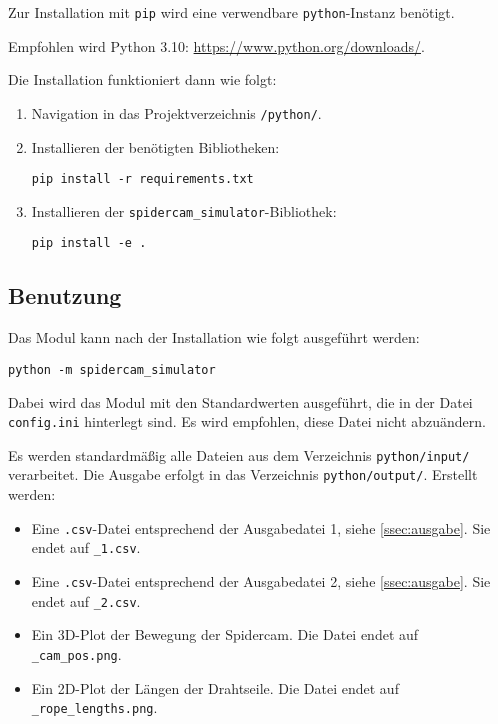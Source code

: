 Zur Installation mit \texttt{pip} wird eine verwendbare \texttt{python}-Instanz benötigt.

Empfohlen wird Python 3.10: \url{https://www.python.org/downloads/}.

Die Installation funktioniert dann wie folgt:
\begin{enumerate}
    \item Navigation in das Projektverzeichnis \texttt{/python/}.
    \item Installieren der benötigten Bibliotheken:
          \begin{center}
              \texttt{pip install -r requirements.txt}
          \end{center}
    \item Installieren der \texttt{spidercam\_simulator}-Bibliothek:
          \begin{center}
              \texttt{pip install -e .}
          \end{center}
\end{enumerate}


\newpage
\subsection{Benutzung}
\label{ssec:benutzung}

Das Modul kann nach der Installation wie folgt ausgeführt werden:
\begin{center}
    \texttt{python -m spidercam\_simulator}
\end{center}

Dabei wird das Modul mit den Standardwerten ausgeführt, die in der Datei \texttt{config.ini} hinterlegt sind.
Es wird empfohlen, diese Datei nicht abzuändern.

Es werden standardmäßig alle Dateien aus dem Verzeichnis \texttt{python/input/} verarbeitet.
Die Ausgabe erfolgt in das Verzeichnis \texttt{python/output/}.
Erstellt werden:
\begin{itemize}
    \item Eine \texttt{.csv}-Datei entsprechend der Ausgabedatei 1, siehe \ref{ssec:ausgabe}.
          Sie endet auf \texttt{\_1.csv}.
    \item Eine \texttt{.csv}-Datei entsprechend der Ausgabedatei 2, siehe \ref{ssec:ausgabe}.
          Sie endet auf \texttt{\_2.csv}.
    \item Ein 3D-Plot der Bewegung der Spidercam.
          Die Datei endet auf \texttt{\_cam\_pos.png}.
    \item Ein 2D-Plot der Längen der Drahtseile.
          Die Datei endet auf \texttt{\_rope\_lengths.png}.
\end{itemize}

